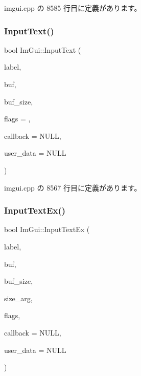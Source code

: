  imgui.\+cpp の 8585 行目に定義があります。

\mbox{\label{namespace_im_gui_af2faa757ec3f5e6379f15b0acfac48f7}} 
\subsubsection{\texorpdfstring{Input\+Text()}{InputText()}}
{\footnotesize\ttfamily bool Im\+Gui\+::\+Input\+Text (\begin{DoxyParamCaption}\item[{const char $\ast$}]{label,  }\item[{char $\ast$}]{buf,  }\item[{size\+\_\+t}]{buf\+\_\+size,  }\item[{\mbox{\hyperlink{imgui_8h_a7d2c6153a6b9b5d3178ce82434ac9fb8}{Im\+Gui\+Input\+Text\+Flags}}}]{flags = {},  }\item[{\mbox{\hyperlink{imgui_8h_ae9254e6ad76a9bc7abc20929e07b29c5}{Im\+Gui\+Text\+Edit\+Callback}}}]{callback = {\ttfamily NULL},  }\item[{void $\ast$}]{user\+\_\+data = {\ttfamily NULL} }\end{DoxyParamCaption})}



 imgui.\+cpp の 8567 行目に定義があります。

\mbox{\label{namespace_im_gui_a4a62260abe773d4e193db94cdfdc41bf}} 
\subsubsection{\texorpdfstring{Input\+Text\+Ex()}{InputTextEx()}}
{\footnotesize\ttfamily bool Im\+Gui\+::\+Input\+Text\+Ex (\begin{DoxyParamCaption}\item[{const char $\ast$}]{label,  }\item[{char $\ast$}]{buf,  }\item[{int}]{buf\+\_\+size,  }\item[{const \mbox{\hyperlink{struct_im_vec2}{Im\+Vec2}} \&}]{size\+\_\+arg,  }\item[{\mbox{\hyperlink{imgui_8h_a7d2c6153a6b9b5d3178ce82434ac9fb8}{Im\+Gui\+Input\+Text\+Flags}}}]{flags,  }\item[{\mbox{\hyperlink{imgui_8h_ae9254e6ad76a9bc7abc20929e07b29c5}{Im\+Gui\+Text\+Edit\+Callback}}}]{callback = {\ttfamily NULL},  }\item[{void $\ast$}]{user\+\_\+data = {\ttfamily NULL} }\end{DoxyParamCaption})}




